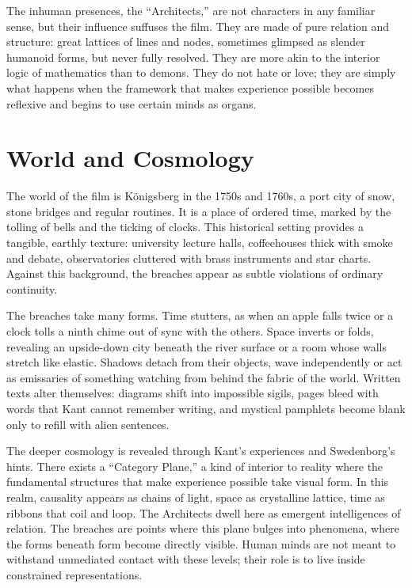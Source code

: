 \documentclass[12pt]{article}
\begin{document}
The inhuman presences, the “Architects,” are not characters in any familiar sense, but their influence suffuses the film. They are made of pure relation and structure: great lattices of lines and nodes, sometimes glimpsed as slender humanoid forms, but never fully resolved. They are more akin to the interior logic of mathematics than to demons. They do not hate or love; they are simply what happens when the framework that makes experience possible becomes reflexive and begins to use certain minds as organs.

\section*{World and Cosmology}

The world of the film is Königsberg in the 1750s and 1760s, a port city of snow, stone bridges and regular routines. It is a place of ordered time, marked by the tolling of bells and the ticking of clocks. This historical setting provides a tangible, earthly texture: university lecture halls, coffeehouses thick with smoke and debate, observatories cluttered with brass instruments and star charts. Against this background, the breaches appear as subtle violations of ordinary continuity.

The breaches take many forms. Time stutters, as when an apple falls twice or a clock tolls a ninth chime out of sync with the others. Space inverts or folds, revealing an upside-down city beneath the river surface or a room whose walls stretch like elastic. Shadows detach from their objects, wave independently or act as emissaries of something watching from behind the fabric of the world. Written texts alter themselves: diagrams shift into impossible sigils, pages bleed with words that Kant cannot remember writing, and mystical pamphlets become blank only to refill with alien sentences.

The deeper cosmology is revealed through Kant’s experiences and Swedenborg’s hints. There exists a “Category Plane,” a kind of interior to reality where the fundamental structures that make experience possible take visual form. In this realm, causality appears as chains of light, space as crystalline lattice, time as ribbons that coil and loop. The Architects dwell here as emergent intelligences of relation. The breaches are points where this plane bulges into phenomena, where the forms beneath form become directly visible. Human minds are not meant to withstand unmediated contact with these levels; their role is to live inside constrained representations.
\end{document}
